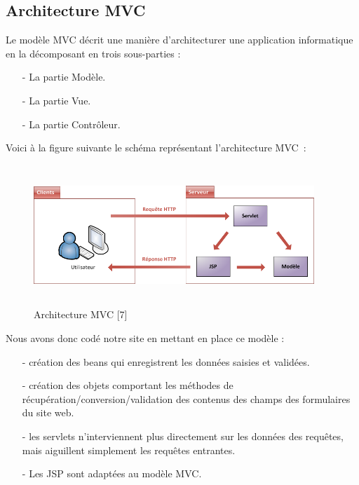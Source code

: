 \documentclass[11.5pt]{report}
\begin{document}
\subsection{Architecture MVC }
Le modèle MVC décrit une manière d’architecturer une application informatique en la décomposant en trois sous-parties :\\
\begin{itemize}
	\item [-] La partie Modèle.
	\item [-] La partie Vue.
	\item [-] La partie Contrôleur.
\end{itemize}
Voici à la figure suivante le schéma représentant l’architecture MVC : \\
\begin{figure}[h]
	
	\begin{center}
		\includegraphics[width=300pt,height=150pt]{mvc.png} 
		\caption{Architecture MVC [7]}
	\end{center}
	
\end{figure}
\newpage
Nous avons donc codé notre site en mettant en place ce modèle :\\
\begin{itemize}
	\item [-] création des beans qui enregistrent les données saisies et validées.
	\item [-] création des objets comportant les méthodes de récupération/conversion/validation des contenus des champs des formulaires du site web.
	\item [-] les servlets n'interviennent plus directement sur les données des requêtes, mais aiguillent simplement les requêtes entrantes. 
	\item [-] Les JSP sont adaptées au modèle MVC.
\end{itemize}
\end{document}
